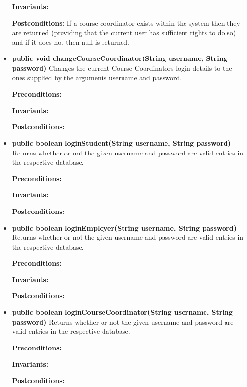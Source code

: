 \documentclass[11pt]{l3deliverable}
\begin{document}
\begin{itemize}
{\textbf{Invariants:}

\textbf{Postconditions:} If a course coordinator exists within the
system then they are returned (providing that the current user has
sufficient rights to do so) and if it does not then null is returned.}

\item{\textbf{public void changeCourseCoordinator(String username,
    String password)}
Changes the current Course Coordinators login details to the ones
supplied by the arguments username and password.

\textbf{Preconditions:}

\textbf{Invariants:}

\textbf{Postconditions:}}

\item{\textbf{public boolean loginStudent(String username, String
    password)} 
Returns whether or not the given username and password are valid
entries in the respective database.

\textbf{Preconditions:}

\textbf{Invariants:}

\textbf{Postconditions:}

}

\item{\textbf{public boolean loginEmployer(String username, String
    password)} 
Returns whether or not the given username and password are valid
entries in the respective database.

\textbf{Preconditions:}

\textbf{Invariants:}

\textbf{Postconditions:}

}

\item{\textbf{public boolean loginCourseCoordinator(String username, String
    password)} 
Returns whether or not the given username and password are valid
entries in the respective database.

\textbf{Preconditions:}

\textbf{Invariants:}

\textbf{Postconditions:}

}

\end{itemize}

\newpage


\end{document}
